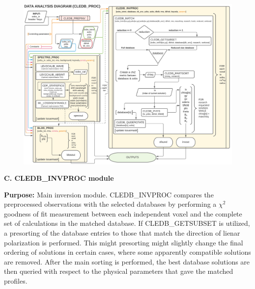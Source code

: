 \documentclass{article}
\begin{document}
\begin{figure}[!p]
\vspace{-1cm}\hspace{-1.2cm}\includegraphics[angle=-90,width=1.12\columnwidth]{figs/4_CLEDB_PROC.pdf}
\end{figure} 

\newpage

\textbf{C. CLEDB\_INVPROC module}

\textbf{Purpose:} Main inversion module. CLEDB\_INVPROC compares the preprocessed observations with the selected databases by performing a $\chi^2$ goodness of fit measurement between each independent voxel and the complete set of calculations in the matched database. If CLEDB\_GETSUBSET is utilized, a presorting of the database entries to those that match the direction of lienar polarization is performed. This might presorting might slightly change the final ordering of solutions in certain cases, where some apparently compatible solutions are removed. After the main sorting is performed, the best database solutions are then queried with respect to the physical parameters that gave the matched profiles. 

~
\end{document}
